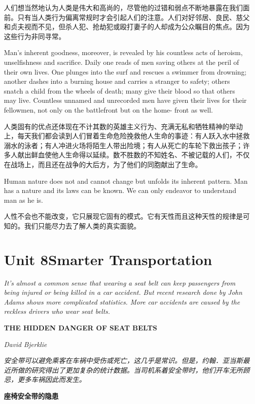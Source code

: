 \documentclass[cs4size, a4paper,12pt]{article}
\newcounter{numpar}
\newcommand*{\newpar}{\numpar{}}
\begin{document}
人们想当然地认为人类是伟大和高尚的，尽管他的过错和弱点不断地暴露在我们面前。只有当人类行为偏离常规时才会引起人们的注意。人们对好邻居、良民、慈父和贞夫视而不见，但杀人犯、抢劫犯或殴打妻子的人却成为公众瞩目的焦点。因为这些行为非同寻常。

\newpar Man's inherent goodness, moreover, is revealed by his countless acts of heroism, unselfishness and sacrifice. Daily one reads of men saving others at the peril of their
own lives. One plunges into the surf and rescues a swimmer from drowning; another
dashes into a burning house and carries a stranger to safety; others snatch a child from
the wheels of death; many give their blood so that others may live. Countless unnamed and unrecorded men have given their lives for their fellowmen, not only on the battlefront but on the home- front as well.

人类固有的优点还体现在不计其数的英雄主义行为、充满无私和牺牲精神的举动上，每天我们都会读到人们冒着生命危险挽救他人生命的事迹：有人跃入水中拯救溺水的泳者；有人冲进火场将陌生人带出险境；有人从死亡的车轮下救出孩子；许多人献出鲜血使他人生命得以延续。数不胜数的不知姓名、不被记载的人们，不仅在战场上，而且还在战争的大后方，为了他们的同胞献出了生命。

\newpar Human nature does not and cannot change but unfolds its inherent pattern. Man has a nature and its laws can be known. We can only endeavor to understand man as he is.

人性不会也不能改变，它只展现它固有的模式。它有天性而且这种天性的规律是可知的。我们只能尽力去了解人类的真实面貌。

\section*{Unit 8\qquad{}Smarter Transportation}
\textit{It's almost a common sense that wearing a seat belt can keep passengers from being injured or being killed in a car accident. But recent research done by John Adams shows more complicated statistics. More car accidents are caused by the reckless drivers who wear seat belts.}

\begin{center}
\textcolor{tcolor}{\bf THE HIDDEN DANGER OF SEAT BELTS}
\end{center}
\hfill\textit{David Bjerklie}

\textit{安全带可以避免乘客在车祸中受伤或死亡，这几乎是常识。但是，约翰．亚当斯最近所做的研究得出了更加复杂的统计数据。当司机系着安全带时，他们开车无所顾忌，更多车祸因此而发生。}\setcounter{numpar}{0}
\begin{center}
\textcolor{tcolor}{\bf 座椅安全带的隐患}
\end{center}
\end{document}
